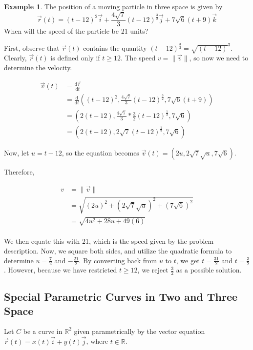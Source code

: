 \documentclass[11pt]{article}
\theoremstyle{plain} %
\theoremstyle{definition}
\theoremstyle{example}
\newtheorem*{example}{Example}
\theoremstyle{remark}
\begin{document}
\begin{example}
The position of a moving particle in three space is given by $$\vec{r}(t) = (t-12)^2\vec{i} + \frac{4\sqrt{7}}{3}(t-12)^{\frac{3}{2}}\vec{j} + 7\sqrt{6}(t+9)\vec{k}$$ When will the speed of the particle be 21 units? 
\end{example}

First, observe that $\vec{r}(t)$ contains the quantity $(t-12)^{\frac{3}{2}} = \sqrt{(t-12)}^3$. Clearly, $\vec{r}(t)$ is defined only if $t \geq 12$. The speed $v = \|\vec{v}\|$, so now we need to determine the velocity.

\begin{align*}
\vec{v}(t) &= \frac{\mathrm d \vec{r}}{\mathrm d t} \\
&= \frac{\mathrm d}{\mathrm d t}\left((t-12)^2,  \frac{4\sqrt{7}}{3}(t-12)^{\frac{3}{2}}, 7\sqrt{6}(t+9)\right)\\
&= \left(2(t-12), \frac{4\sqrt{7}}{3}*\frac{3}{2}(t-12)^{\frac{1}{2}}, 7\sqrt{6}\right)\\
&= \left(2(t-12), 2\sqrt{7}(t-12)^{\frac{1}{2}}, 7\sqrt{6}\right)
\end{align*}

Now, let $u=t-12$, so the equation becomes $\vec{v}(t) = \left(2u, 2\sqrt{7} \sqrt{u}, 7\sqrt{6}\right)$.


Therefore, 

\begin{align*}
v &= \|\vec{v}\| \\
&= \sqrt{(2u)^2+\left(2\sqrt{7}\sqrt{u}\right)^2+\left(7\sqrt{6}\right)^2} \\
&= \sqrt{4u^2+28u+49(6)}\\
\end{align*}

We then equate this with 21, which is the speed given by the problem description. Now, we square both sides, and utilize the quadratic formula to determine $u = \frac{7}{2}$ and $-\frac{21}{2}$. By converting back from $u$ to $t$, we get $t = \frac{31}{2}$ and $t=\frac{3}{2}$. However, because we have restricted $t \geq 12$, we reject $\frac{3}{2}$ as a possible solution.


\subsection{Special Parametric Curves in Two and Three Space}

Let $C$ be a curve in $\mathbb R^2$ given parametrically by the vector equation $\vec{r}(t) = x(t)\vec{i} + y(t)\vec{j}$, where $t \in \mathbb R$.
\end{document}
